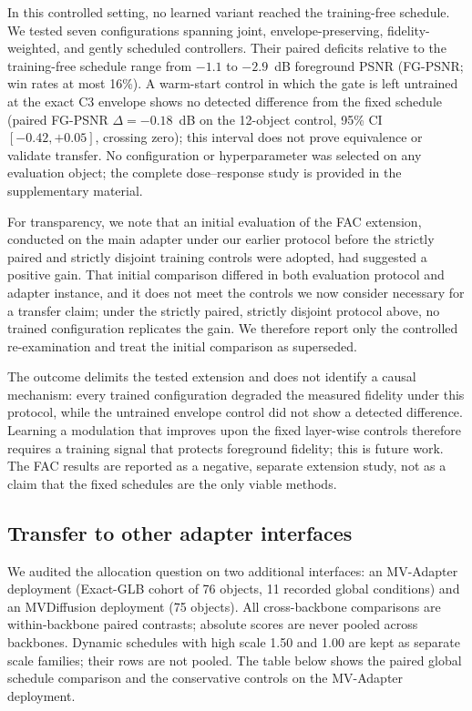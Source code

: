 \documentclass[times,twocolumn,final]{elsarticle}
\begin{document}
In this controlled setting, no learned variant reached the training-free schedule. We tested seven configurations spanning joint, envelope-preserving, fidelity-weighted, and gently scheduled controllers. Their paired deficits relative to the training-free schedule range from $-1.1$ to $-2.9$~dB foreground PSNR (FG-PSNR; win rates at most 16\%). A warm-start control in which the gate is left untrained at the exact C3 envelope shows no detected difference from the fixed schedule (paired FG-PSNR $\Delta=-0.18$~dB on the 12-object control, 95\% CI $[-0.42,+0.05]$, crossing zero); this interval does not prove equivalence or validate transfer. No configuration or hyperparameter was selected on any evaluation object; the complete dose--response study is provided in the supplementary material.

For transparency, we note that an initial evaluation of the FAC extension, conducted on the main adapter under our earlier protocol before the strictly paired and strictly disjoint training controls were adopted, had suggested a positive gain. That initial comparison differed in both evaluation protocol and adapter instance, and it does not meet the controls we now consider necessary for a transfer claim; under the strictly paired, strictly disjoint protocol above, no trained configuration replicates the gain. We therefore report only the controlled re-examination and treat the initial comparison as superseded.

The outcome delimits the tested extension and does not identify a causal mechanism: every trained configuration degraded the measured fidelity under this protocol, while the untrained envelope control did not show a detected difference. Learning a modulation that improves upon the fixed layer-wise controls therefore requires a training signal that protects foreground fidelity; this is future work. The FAC results are reported as a negative, separate extension study, not as a claim that the fixed schedules are the only viable methods.

\FloatBarrier\subsection{Transfer to other adapter interfaces}
\label{subsec:adapterdep}

We audited the allocation question on two additional interfaces: an
MV-Adapter deployment (Exact-GLB cohort of 76 objects, 11 recorded global
conditions) and an MVDiffusion deployment (75 objects). All cross-backbone
comparisons are within-backbone paired contrasts; absolute scores are never
pooled across backbones. Dynamic schedules with high scale 1.50 and 1.00 are
kept as separate scale families; their rows are not pooled. The table below
shows the paired global schedule comparison and the conservative controls on
the MV-Adapter deployment.
\end{document}

